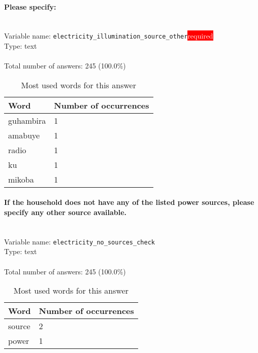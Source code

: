 \documentclass[11.5pt, a4paper]{scrartcl}
\begin{document}
\paragraph{Please specify:}
\  \\Variable name: \texttt{electricity\_illumination\_source\_other}\hfill\colorbox{red}{\small{\textcolor{white}{required}}}\\
 Type: text\\
\\Total number of answers: 245 (100.0\%)
\\[0.2em]\begin{table}[H]
 \begin{tabular}{p{4cm}|p{8cm}}
Word & Number of occurrences  \\
\hline
\cellcolor{mygray}guhambira&\cellcolor{mygray}1\\
\hline
amabuye&1\\
\hline
\cellcolor{mygray}radio&\cellcolor{mygray}1\\
\hline
ku&1\\
\hline
\cellcolor{mygray}mikoba&\cellcolor{mygray}1\\
\hline
\end{tabular}
\caption{\label{tab:table-name} Most used words for this answer}
\end{table}
\paragraph{If the household does not have any of the listed power sources, please specify any other source available.}
\  \\Variable name: \texttt{electricity\_no\_sources\_check}\\
Type: text\\
\\Total number of answers: 245 (100.0\%)
\\[0.2em]\begin{table}[H]
 \begin{tabular}{p{4cm}|p{8cm}}
Word & Number of occurrences  \\
\hline
\cellcolor{mygray}source&\cellcolor{mygray}2\\
\hline
power&1\\
\hline
\end{tabular}
\caption{\label{tab:table-name} Most used words for this answer}
\end{table}
\end{document}
